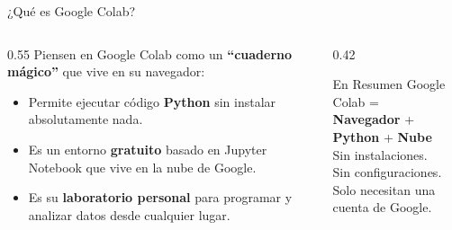 \documentclass[aspectratio=169]{beamer}
\begin{document}
\begin{frame}{¿Qué es Google Colab?}
  \begin{columns}[T]
    \begin{column}{0.55\textwidth}
      \small
      Piensen en Google Colab como un \textbf{``cuaderno mágico''}
      que vive en su navegador:
      \begin{itemize}\setlength\itemsep{4pt}
        \item Permite ejecutar código \textbf{Python} sin instalar
              absolutamente nada.
        \item Es un entorno \textbf{gratuito} basado en Jupyter Notebook
              que vive en la nube de Google.
        \item Es su \textbf{laboratorio personal} para programar y
              analizar datos desde cualquier lugar.
      \end{itemize}
    \end{column}
    \begin{column}{0.42\textwidth}
      \begin{conceptbox}{\faCloud\enspace En Resumen}
        \small
        Google Colab = \\[3pt]
        \textbf{Navegador} + \textbf{Python} + \textbf{Nube}\\[3pt]
        Sin instalaciones. \\
        Sin configuraciones. \\
        Solo necesitan una cuenta de Google.
      \end{conceptbox}
    \end{column}
  \end{columns}
\end{frame}
\end{document}
